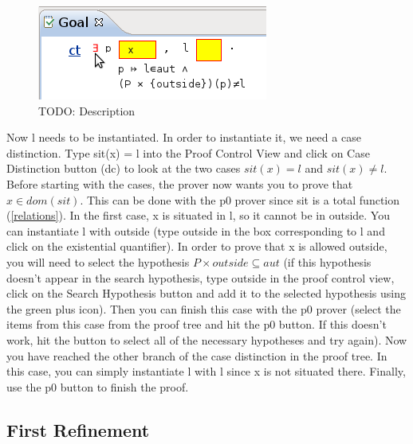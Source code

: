 \begin{figure}[!ht]
\begin{center}
	\includegraphics{img/tutorial/tut_10_instantiate_p.png}
	\caption{TODO: Description}
	\label{fig_tut_10_instantiate_p}
\end{center}
\end{figure}


Now \textsf{l} needs to be instantiated. In order to instantiate it, we need a case distinction. Type sit(x) = l into the \textsf{Proof Control View} and click on \textsf{Case Distinction button (dc)}  to look at the two cases $sit(x) = l$ and $sit(x) \neq l$. Before starting with the cases, the prover now wants you to prove that $x \in dom(sit)$. This can be done with the \textsf{p0} prover since \textsf{sit} is a total function (\ref{relations}). In the first case, \textsf{x} is situated in \textsf{l}, so it cannot be in \textsf{outside}. You can instantiate \textsf{l} with \textsf{outside} (type \textsf{outside} in the box corresponding to \textsf{l} and click on the existential quantifier). In order to prove that \textsf{x} is allowed \textsf{outside}, you will need to select the hypothesis $P \times {outside} \subseteq aut$ (if this hypothesis doesn't appear in the search hypothesis, type outside in the proof control view, click on the \textsf{Search Hypothesis button} and add it to the selected hypothesis using the green plus icon). Then you can finish this case with the \textsf{p0} prover (select the items from this case from the proof tree and hit the \textsf{p0} button. If this doesn't work, hit the  button to select all of the necessary hypotheses and try again). Now you have reached the other branch of the case distinction in the proof tree. In this case, you can simply instantiate \textsf{l} with \textsf{l} since 
\textsf{x} is not situated there. Finally, use the \textsf{p0} button to finish the proof. 

\subsection{First Refinement}
\label{tut_location_first_refinement}

